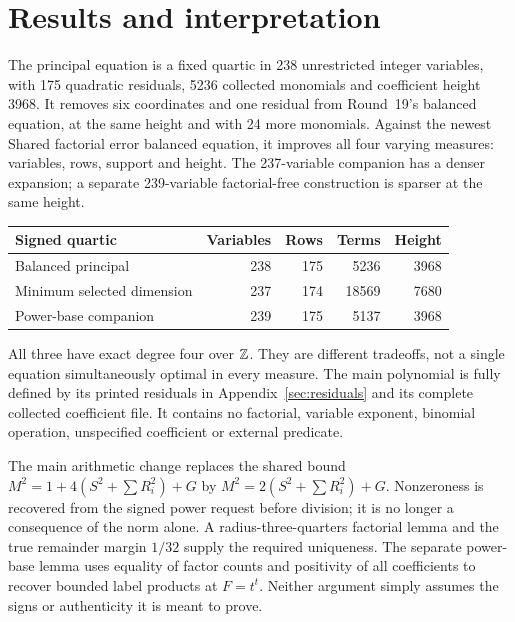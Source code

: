 \section{Results and interpretation}
\label{sec:results}
The principal equation is a fixed quartic in 238 unrestricted integer
variables, with 175 quadratic residuals, 5236 collected monomials and
coefficient height 3968. It removes six coordinates and one residual
from Round~19's balanced equation, at the same height and with 24 more
monomials. Against the newest Shared factorial error balanced equation,
it improves all four varying measures: variables, rows, support and height.
The 237-variable companion has a denser expansion; a separate 239-variable
factorial-free construction is sparser at the same height.

\begin{center}\small
\begin{tabular}{@{}lrrrr@{}}\toprule
Signed quartic & Variables & Rows & Terms & Height\\\midrule
Balanced principal &238&175&5236&3968\\
Minimum selected dimension &237&174&18569&7680\\
Power-base companion &239&175&5137&3968\\\bottomrule
\end{tabular}
\end{center}
All three have exact degree four over $\mathbb Z$. They are different tradeoffs,
not a single equation simultaneously optimal in every measure. The main
polynomial is fully defined by its printed residuals in
Appendix~\ref{sec:residuals} and its complete collected coefficient file.
It contains no factorial, variable exponent, binomial operation,
unspecified coefficient or external predicate.

The main arithmetic change replaces the shared bound
$M^2=1+4(S^2+\sum R_i^2)+G$ by
$M^2=2(S^2+\sum R_i^2)+G$.
Nonzeroness is recovered from the signed power request before division;
it is no longer a consequence of the norm alone. A radius-three-quarters
factorial lemma and the true remainder margin $1/32$ supply the required
uniqueness. The separate power-base lemma uses equality of factor counts
and positivity of all coefficients to recover bounded label products at
$F=t^t$. Neither argument simply assumes the signs or authenticity it
is meant to prove.

